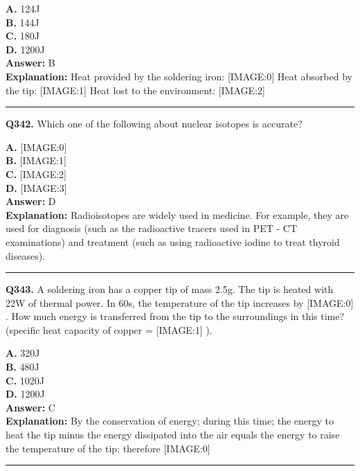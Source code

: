 \documentclass[12pt]{article}
\begin{document}
\textbf{A.} 124J \\
\textbf{B.} 144J \\
\textbf{C.} 180J \\
\textbf{D.} 1200J \\

\textbf{Answer:} B \\
\textbf{Explanation:} Heat provided by the soldering iron:
[IMAGE:0]
Heat absorbed by the tip:
[IMAGE:1]
Heat lost to the environment:
[IMAGE:2]

\hrule
\vspace{1em}


\noindent
\textbf{Q342.} Which one of the following about nuclear isotopes is accurate?



\textbf{A.} [IMAGE:0] \\
\textbf{B.} [IMAGE:1] \\
\textbf{C.} [IMAGE:2] \\
\textbf{D.} [IMAGE:3] \\

\textbf{Answer:} D \\
\textbf{Explanation:} Radioisotopes are widely used in medicine. For example, they are used for diagnosis (such as the radioactive tracers used in PET - CT examinations) and treatment (such as using radioactive iodine to treat thyroid diseases).

\hrule
\vspace{1em}


\noindent
\textbf{Q343.} A soldering iron has a copper tip of mass 2.5g.
The tip is heated with 22W of thermal power. In 60s, the temperature of the tip increases by
[IMAGE:0]
.
How much energy is transferred from the tip to the surroundings in this time? (specific heat capacity of copper =
[IMAGE:1]
).



\textbf{A.} 320J \\
\textbf{B.} 480J \\
\textbf{C.} 1020J \\
\textbf{D.} 1200J \\

\textbf{Answer:} C \\
\textbf{Explanation:} By the conservation of energy; during this time; the energy to heat the tip minus the energy dissipated into the air equals the energy to raise the temperature of the tip: therefore
[IMAGE:0]

\hrule
\vspace{1em}
\end{document}
